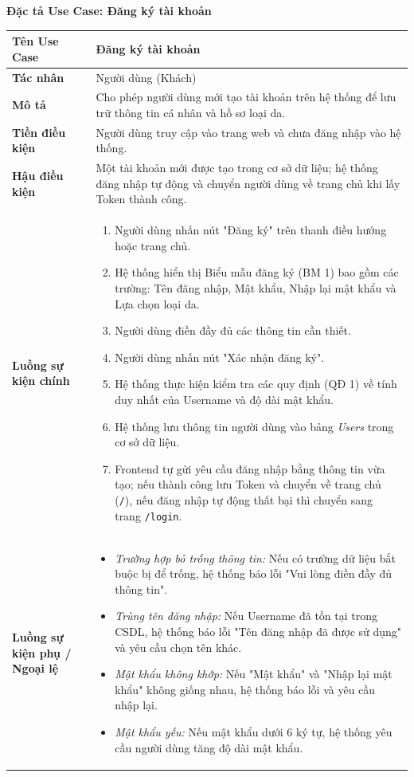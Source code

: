 \documentclass[12pt,a4paper]{article}
\begin{document}
\vspace{0.5cm}
\textbf{Đặc tả Use Case: Đăng ký tài khoản}

\begin{center}
\renewcommand{\arraystretch}{1.4}
\begin{tabular}{|p{4cm}|p{10cm}|}
\hline
\rowcolor{blue!15}
\textbf{Tên Use Case} & \textbf{Đăng ký tài khoản} \\ \hline
\textbf{Tác nhân} & Người dùng (Khách) \\ \hline
\textbf{Mô tả} & Cho phép người dùng mới tạo tài khoản trên hệ thống để lưu trữ thông tin cá nhân và hồ sơ loại da. \\ \hline
\textbf{Tiền điều kiện} & Người dùng truy cập vào trang web và chưa đăng nhập vào hệ thống. \\ \hline
\textbf{Hậu điều kiện} & Một tài khoản mới được tạo trong cơ sở dữ liệu; hệ thống đăng nhập tự động và chuyển người dùng về trang chủ khi lấy Token thành công. \\ \hline
\textbf{Luồng sự kiện chính} & 
\begin{enumerate}
    \item Người dùng nhấn nút "Đăng ký" trên thanh điều hướng hoặc trang chủ.
    \item Hệ thống hiển thị Biểu mẫu đăng ký (BM 1) bao gồm các trường: Tên đăng nhập, Mật khẩu, Nhập lại mật khẩu và Lựa chọn loại da.
    \item Người dùng điền đầy đủ các thông tin cần thiết.
    \item Người dùng nhấn nút "Xác nhận đăng ký".
    \item Hệ thống thực hiện kiểm tra các quy định (QĐ 1) về tính duy nhất của Username và độ dài mật khẩu.
    \item Hệ thống lưu thông tin người dùng vào bảng \textit{Users} trong cơ sở dữ liệu.
    \item Frontend tự gửi yêu cầu đăng nhập bằng thông tin vừa tạo; nếu thành công lưu Token và chuyển về trang chủ (\texttt{/}), nếu đăng nhập tự động thất bại thì chuyển sang trang \texttt{/login}.
\end{enumerate} \\ \hline
\textbf{Luồng sự kiện phụ / Ngoại lệ} & 
\begin{itemize}
    \item \textit{Trường hợp bỏ trống thông tin:} Nếu có trường dữ liệu bắt buộc bị để trống, hệ thống báo lỗi "Vui lòng điền đầy đủ thông tin".
    \item \textit{Trùng tên đăng nhập:} Nếu Username đã tồn tại trong CSDL, hệ thống báo lỗi "Tên đăng nhập đã được sử dụng" và yêu cầu chọn tên khác.
    \item \textit{Mật khẩu không khớp:} Nếu "Mật khẩu" và "Nhập lại mật khẩu" không giống nhau, hệ thống báo lỗi và yêu cầu nhập lại.
    \item \textit{Mật khẩu yếu:} Nếu mật khẩu dưới 6 ký tự, hệ thống yêu cầu người dùng tăng độ dài mật khẩu.
\end{itemize} \\ \hline
\end{tabular}
\end{center}
\end{document}
